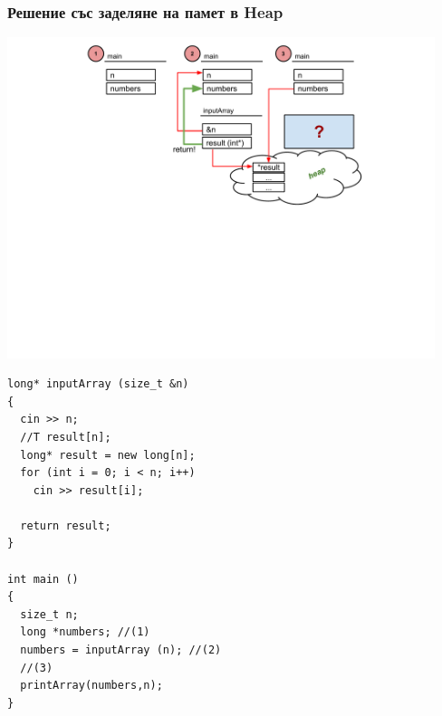 \documentclass{beamer}
\begin{document}
\begin{frame}[fragile]
\frametitle{Решение със заделяне на памет в Heap}


\includegraphics[width=12.5cm]{images/heap}

\vspace{-200px}
\begin{flushleft}
\begin{lstlisting}
long* inputArray (size_t &n)
{ 
  cin >> n;
  //T result[n];
  long* result = new long[n];
  for (int i = 0; i < n; i++)
    cin >> result[i];

  return result;
}

int main ()
{
  size_t n;
  long *numbers; //(1)
  numbers = inputArray (n); //(2)
  //(3) 
  printArray(numbers,n);
}

\end{lstlisting}  
\end{flushleft}

\end{frame}
\end{document}
